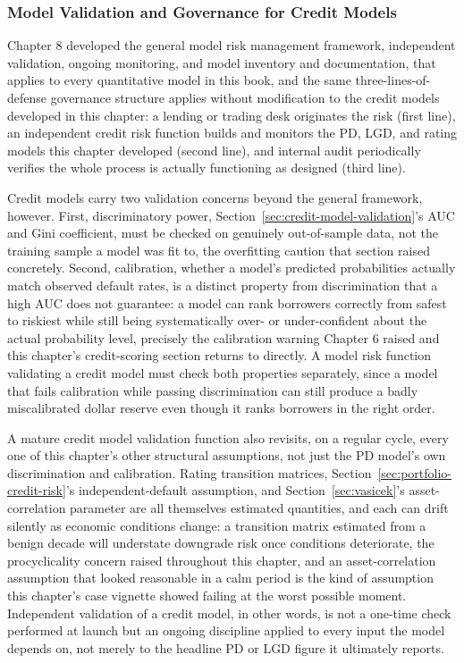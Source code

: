 \documentclass[../ai_in_finance]{subfiles}
\begin{document}
\subsubsection*{Model Validation and Governance for Credit Models}

Chapter 8 developed the general model risk management framework, independent validation, ongoing monitoring, and model inventory and documentation, that applies to every quantitative model in this book, and the same three-lines-of-defense governance structure applies without modification to the credit models developed in this chapter: a lending or trading desk originates the risk (first line), an independent credit risk function builds and monitors the PD, LGD, and rating models this chapter developed (second line), and internal audit periodically verifies the whole process is actually functioning as designed (third line).

Credit models carry two validation concerns beyond the general framework, however. First, discriminatory power, Section~\ref{sec:credit-model-validation}'s AUC and Gini coefficient, must be checked on genuinely out-of-sample data, not the training sample a model was fit to, the overfitting caution that section raised concretely.
Second, calibration, whether a model's predicted probabilities actually match observed default rates, is a distinct property from discrimination that a high AUC does not guarantee: a model can rank borrowers correctly from safest to riskiest while still being systematically over- or under-confident about the actual probability level, precisely the calibration warning Chapter 6 raised and this chapter's credit-scoring section returns to directly. A model risk function validating a credit model must check both properties separately, since a model that fails calibration while passing discrimination can still produce a badly miscalibrated dollar reserve even though it ranks borrowers in the right order.

A mature credit model validation function also revisits, on a regular cycle, every one of this chapter's other structural assumptions, not just the PD model's own discrimination and calibration. Rating transition matrices, Section~\ref{sec:portfolio-credit-risk}'s independent-default assumption, and Section~\ref{sec:vasicek}'s asset-correlation parameter are all themselves estimated quantities, and each can drift silently as economic conditions change: a transition matrix estimated from a benign decade will understate downgrade risk once conditions deteriorate, the procyclicality concern raised throughout this chapter, and an asset-correlation assumption that looked reasonable in a calm period is the kind of assumption this chapter's case vignette showed failing at the worst possible moment.
Independent validation of a credit model, in other words, is not a one-time check performed at launch but an ongoing discipline applied to every input the model depends on, not merely to the headline PD or LGD figure it ultimately reports.
\end{document}
